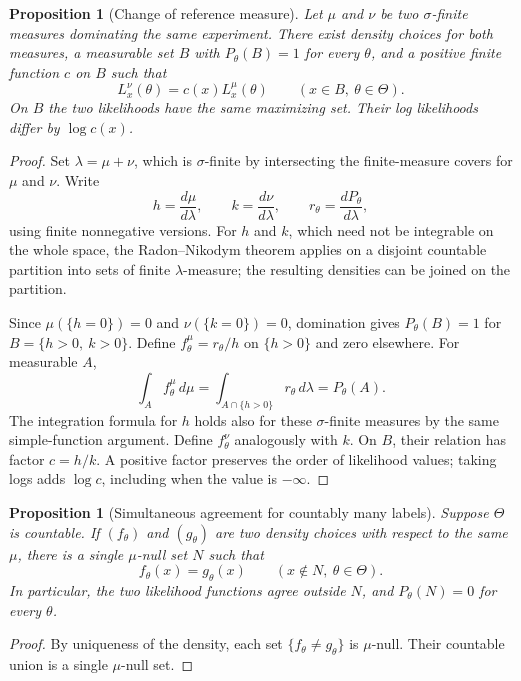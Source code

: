 \documentclass[11pt,oneside]{book}
\newtheorem{proposition}[theorem]{Proposition}
\theoremstyle{definition}
\theoremstyle{remark}
\begin{document}
\begin{proposition}[Change of reference measure]
\label{prop:likelihood-reference}
Let $\mu$ and $\nu$ be two $\sigma$-finite measures dominating the same
experiment. There exist density choices for both measures, a measurable set
$B$ with $P_\theta(B)=1$ for every $\theta$, and a positive finite function
$c$ on $B$ such that
\[
L_x^\nu(\theta)=c(x)L_x^\mu(\theta)
\qquad(x\in B,\ \theta\in\Theta).
\]
On $B$ the two likelihoods have the same maximizing set. Their log
likelihoods differ by $\log c(x)$.
\end{proposition}
\begin{proof}
Set $\lambda=\mu+\nu$, which is $\sigma$-finite by intersecting the
finite-measure covers for $\mu$ and $\nu$. Write
\[
h=\frac{d\mu}{d\lambda},\qquad k=\frac{d\nu}{d\lambda},\qquad
r_\theta=\frac{dP_\theta}{d\lambda},
\]
using finite nonnegative versions. For $h$ and $k$, which need not be
integrable on the whole space, the Radon--Nikodym theorem applies on a
disjoint countable partition into sets of finite $\lambda$-measure;
the resulting densities can be joined on the partition.

Since $\mu(\{h=0\})=0$ and $\nu(\{k=0\})=0$, domination gives
$P_\theta(B)=1$ for $B=\{h>0,\ k>0\}$. Define $f_\theta^\mu=r_\theta/h$
on $\{h>0\}$ and zero elsewhere. For measurable $A$,
\[
\int_A f_\theta^\mu\,d\mu
=\int_{A\cap\{h>0\}}r_\theta\,d\lambda
=P_\theta(A).
\]
The integration formula for $h$ holds also for these $\sigma$-finite
measures by the same simple-function argument. Define $f_\theta^\nu$
analogously with $k$. On $B$, their relation has factor $c=h/k$.
A positive factor preserves the order of likelihood values; taking logs
adds $\log c$, including when the value is $-\infty$.
\end{proof}

\begin{proposition}[Simultaneous agreement for countably many labels]
\label{prop:countable-density-agreement}
Suppose $\Theta$ is countable. If $(f_\theta)$ and $(g_\theta)$ are two
density choices with respect to the same $\mu$, there is a single
$\mu$-null set $N$ such that
\[
f_\theta(x)=g_\theta(x)\qquad(x\notin N,\ \theta\in\Theta).
\]
In particular, the two likelihood functions agree outside $N$, and
$P_\theta(N)=0$ for every $\theta$.
\end{proposition}
\begin{proof}
By uniqueness of the density, each set $\{f_\theta\ne g_\theta\}$ is
$\mu$-null. Their countable union is a single $\mu$-null set.
\end{proof}
\end{document}
